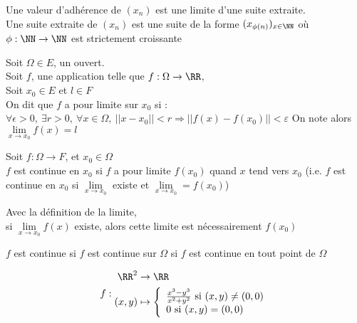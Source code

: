 \documentclass[../main.tex]{subfile}
\begin{document}
\begin{rap}
	Une valeur d'adhérence de $(x_n)$ est une limite d'une suite extraite.\\
	Une suite extraite de $(x_n)$ est une suite de la forme $(x_{\phi(n)})_{x \in \NN}$ où $\phi : \NN \to \NN$ est strictement croissante
\end{rap}

\begin{defi}
	Soit $\Omega \in E$, un ouvert.\\
	Soit $f$, une application telle que $f : \Omega \to \RR$,\\
	Soit $x_0 \in E$ et $l \in F$\\
	On dit que $f$ a pour limite sur $x_0$ si :
	$\forall \epsilon > 0, \ \exists r > 0, \ \forall x \in \Omega, \ ||x - x_0|| < r \Rightarrow ||f(x) - f(x_0)|| < \varepsilon$
	On note alors $\lim\limits_{x \to x_0} f(x) = l$
\end{defi}

\begin{defi}
	Soit $f : \Omega \to F$, et $x_0 \in \Omega$\\
	$f$ est continue en $x_0$ si $f$ a pour limite $f(x_0)$ quand $x$ tend vers $x_0$
	(i.e. $f$ est continue en $x_0$ si $\lim\limits_{x \to x_0}$ existe et $\lim\limits_{x \to x_0} = f(x_0)$)
\end{defi}

\begin{rema}
	Avec la définition de la limite, \\
	si $\lim\limits_{x \to x_0} f(x)$ existe, alors cette limite est nécessairement $f(x_0)$
\end{rema}

\begin{defi}
	$f$ est continue si $f$ est continue sur $\Omega$ si $f$ est continue en tout point de $\Omega$ 
\end{defi}

\begin{ex}
	$$f:
\begin{aligned}
	\RR^2 &\to \RR\\
	(x, y) &\mapsto 
	\left\{
	\begin{array}{l}	
		\frac{x^3 - y^3}{x^2 + y^2} \text{ si } (x, y) \neq (0, 0)\\
		0 \text{ si } (x, y) = (0, 0)
	\end{array}
	\right.
\end{aligned}
	$$
\end{ex}
\end{document}
